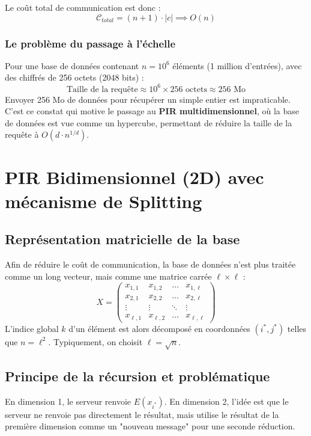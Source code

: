 \documentclass[12pt,a4paper]{report}
\begin{document}
Le coût total de communication est donc :
\[ \mathcal{C}_{total} = (n + 1) \cdot |c| \implies O(n) \]



\subsubsection{Le problème du passage à l'échelle}
Pour une base de données contenant $n = 10^6$ éléments (1 million d'entrées), avec des chiffrés de 256 octets (2048 bits) :
\[ \text{Taille de la requête} \approx 10^6 \times 256 \text{ octets} \approx 256 \text{ Mo} \]
Envoyer 256 Mo de données pour récupérer un simple entier est impraticable. C'est ce constat qui motive le passage au \textbf{PIR multidimensionnel}, où la base de données est vue comme un hypercube, permettant de réduire la taille de la requête à $O(d \cdot n^{1/d})$.




\section{PIR Bidimensionnel (2D) avec mécanisme de Splitting}

\subsection{Représentation matricielle de la base}
Afin de réduire le coût de communication, la base de données n'est plus traitée comme un long vecteur, mais comme une matrice carrée $\ell \times \ell$ :
\[
X =
\begin{pmatrix}
x_{1,1} & x_{1,2} & \dots & x_{1,\ell} \\
x_{2,1} & x_{2,2} & \dots & x_{2,\ell} \\
\vdots & \vdots & \ddots & \vdots \\
x_{\ell,1} & x_{\ell,2} & \dots & x_{\ell,\ell}
\end{pmatrix}
\]
L'indice global $k$ d'un élément est alors décomposé en coordonnées $(i^*, j^*)$ telles que $n = \ell^2$. Typiquement, on choisit $\ell = \sqrt{n}$.

\subsection{Principe de la récursion et problématique}
En dimension 1, le serveur renvoie $E(x_{i^*})$. En dimension 2, l'idée est que le serveur ne renvoie pas directement le résultat, mais utilise le résultat de la première dimension comme un "nouveau message" pour une seconde réduction. 
\end{document}
